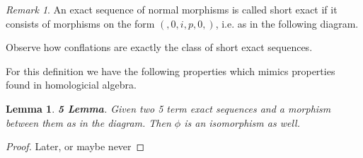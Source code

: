 \documentclass[11pt]{article}
\newtheorem{lemma}[theorem]{Lemma}
\theoremstyle{definition}
\theoremstyle{remark}
\newtheorem*{remark}{Remark}
\begin{document}
            \begin{remark}
                An exact sequence of normal morphisms is called short exact if it consists of morphisms on the form $(,0,i,p,0,)$, i.e. as in the following diagram.

                \begin{center}
                \end{center}

                Observe how conflations are exactly the class of short exact sequences.
            \end{remark}

            For this definition we have the following properties which mimics properties found in homologicial algebra.

            \begin{lemma}
                \textbf{5 Lemma}. Given two 5 term exact sequences and a morphism between them as in the diagram. Then $\phi$ is an isomorphism as well.
                \begin{center}
                \end{center}
            \end{lemma}

            \begin{proof}
                Later, or maybe never
            \end{proof}
\end{document}
